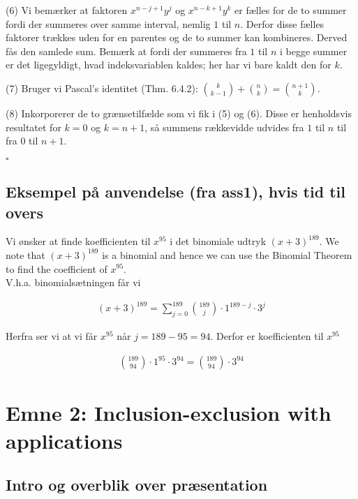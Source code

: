 \documentclass[12pt]{article}
\begin{document}
(6) Vi bemærker at faktoren $x^{n-j+1} y^j$ og $x^{n-k+1}y^k$ er fælles for de to summer fordi der summeres over samme interval, nemlig $1$ til $n$. Derfor disse fælles faktorer trækkes uden for en parentes og de to summer kan kombineres. Derved fås den samlede sum. Bemærk at fordi der summeres fra $1$ til $n$ i begge summer er det ligegyldigt, hvad indeksvariablen kaldes; her har vi bare kaldt den for $k$. 

(7) Bruger vi Pascal's identitet (Thm. 6.4.2): $\binom{k}{k-1}+\binom{n}{k} = \binom{n+1}{k}$.

(8) Inkorporerer de to grænsetilfælde som vi fik i (5) og (6). Disse er henholdsvis resultatet for $k=0$ og $k=n+1$, så summens rækkevidde udvides fra $1$ til $n$ til fra $0$ til $n+1$.

\begin{flushright}
    $\square$
\end{flushright}

\subsection*{Eksempel på anvendelse (fra ass1), hvis tid til overs} 

Vi ønsker at finde koefficienten til $x^{95}$ i det binomiale udtryk $(x+3)^{189}$. We note that $(x+3)^{189}$ is a binomial and hence we can use the Binomial Theorem to find the coefficient of $x^{95}$. \\

V.h.a. binomialsætningen får vi 

\begin{align*}
    (x+3)^{189} = \sum_{j=0}^{189} \binom{189}{j} \cdot 1^{189-j} \cdot 3^j
\end{align*}

Herfra ser vi at vi får $x^{95}$ når $j=189-95=94$. Derfor er koefficienten til $x^{95}$ 

\begin{align*}
    \binom{189}{94} \cdot 1^{95} \cdot 3^{94} = \binom{189}{94} \cdot 3^{94}
\end{align*}

\clearpage 

\section{Emne 2: Inclusion-exclusion with applications}

\subsection*{Intro og overblik over præsentation}
\end{document}
